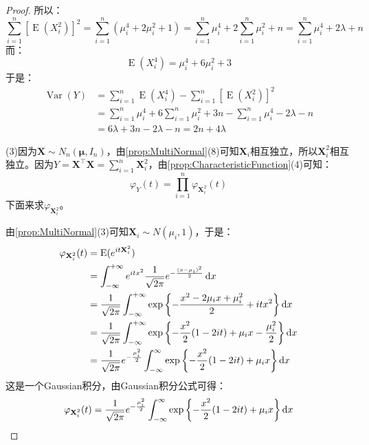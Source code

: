 \begin{proof}
	所以：
	\begin{equation*}
		\sum_{i=1}^{n}[\operatorname{E}(X_i^2)]^2=\sum_{i=1}^{n}(\mu_i^4+2\mu_i^2+1)=\sum_{i=1}^{n}\mu_i^4+2\sum_{i=1}^{n}\mu_i^2+n=\sum_{i=1}^{n}\mu_i^4+2\lambda+n
	\end{equation*}
	而：
	\begin{equation*}
		\operatorname{E}(X_i^4)=\mu_i^4+6\mu_i^2+3
	\end{equation*}
	于是：
	\begin{align*}
		\operatorname{Var}(Y)
		&=\sum_{i=1}^{n}\operatorname{E}(X_i^4)-\sum_{i=1}^{n}[\operatorname{E}(X_i^2)]^2 \\
		&=\sum_{i=1}^{n}\mu_i^4+6\sum_{i=1}^{n}\mu_i^2+3n-\sum_{i=1}^{n}\mu_i^4-2\lambda-n \\
		&=6\lambda+3n-2\lambda-n=2n+4\lambda
	\end{align*}\par
	(3)因为$\mathbf{X}\sim N_n(\boldsymbol{\mu},I_n)$，由\cref{prop:MultiNormal}(8)可知$\mathbf{X}_i$相互独立，所以$\mathbf{X}_i^2$相互独立。因为$Y=\mathbf{X}^{\top}\mathbf{X}=\sum\limits_{i=1}^n\mathbf{X}_i^2$，由\cref{prop:CharacteristicFunction}(4)可知：
	\begin{equation*}
		\varphi_{Y}(t)=\prod_{i=1}^n\varphi_{\mathbf{X}_i^2}(t)
	\end{equation*}
	下面来求$\varphi_{\mathbf{X}_i^2}$。\par
	由\cref{prop:MultiNormal}(3)可知$\mathbf{X}_i\sim N(\mu_i,1)$，于是：
	\begin{align*}
		\varphi_{\mathbf{X}_i^2}(t)
		&=\operatorname{E}(e^{it\mathbf{X}_i^2}) \\
		&=\int_{-\infty}^{+\infty}e^{itx^2}\frac{1}{\sqrt{2\pi}}e^{-\frac{(x-\mu_i)^2}{2}}\mathop{}\!\mathrm{d} x \\
		&=\frac{1}{\sqrt{2\pi}}\int_{-\infty}^{+\infty}\exp\left\{-\frac{x^2 - 2\mu_ix + \mu_i^2}{2} + itx^2\right\}\mathop{}\!\mathrm{d} x \\
		&=\frac{1}{\sqrt{2\pi}}\int_{-\infty}^{+\infty}\exp\left\{-\frac{x^2}{2} (1 - 2it) + \mu_ix - \frac{\mu_i^2}{2}\right\}\mathop{}\!\mathrm{d} x \\
		&=\frac{1}{\sqrt{2\pi}}e^{-\frac{\mu_i^2}{2}} \int_{-\infty}^{\infty} \exp\left\{-\frac{x^2}{2} (1 - 2it) + \mu_ix\right\}\mathop{}\!\mathrm{d} x
	\end{align*}
	这是一个Gaussian积分，由Gaussian积分公式可得：
	\begin{align*}
		\varphi_{\mathbf{X}_i^2}(t)
		&=\frac{1}{\sqrt{2\pi}}e^{-\frac{\mu_i^2}{2}} \int_{-\infty}^{\infty}\exp\left\{-\frac{x^2}{2} (1 - 2it) + \mu_i x\right\}\dif x \\

\end{align*}
\end{proof}
